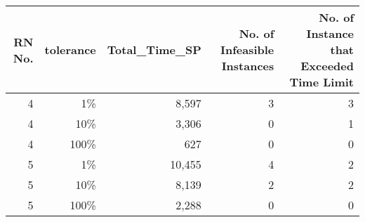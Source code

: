 \begin{tabular}{rrrrr}
\toprule
 RN No. & tolerance & Total_Time_SP & No. of Infeasible Instances & No. of Instance that Exceeded Time Limit \\
\midrule
      4 &        1\% &         8,597 &                           3 &                                        3 \\
      4 &       10\% &         3,306 &                           0 &                                        1 \\
      4 &      100\% &           627 &                           0 &                                        0 \\
      5 &        1\% &        10,455 &                           4 &                                        2 \\
      5 &       10\% &         8,139 &                           2 &                                        2 \\
      5 &      100\% &         2,288 &                           0 &                                        0 \\
\bottomrule
\end{tabular}
